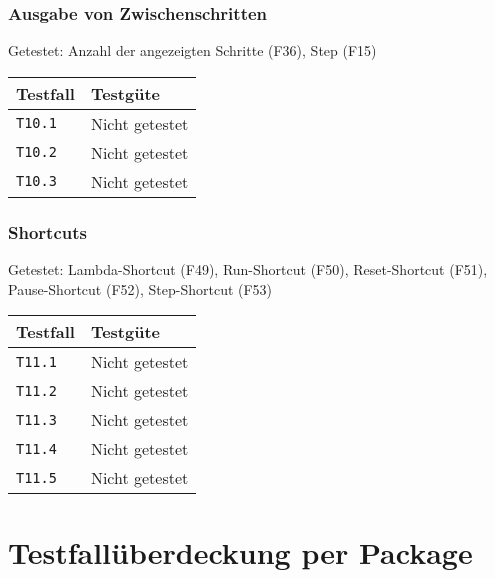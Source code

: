 \documentclass[parskip=full,11pt,twoside]{scrartcl}
\newcommand{\testline}[2]{
    \texttt{#1} & 
    \ifthenelse{\equal{#2}{Nicht getestet}}
        {\cellcolor{red!20}}
        {}
    \ifthenelse{\equal{#2}{Manuell getestet}}
        {\cellcolor{orange!20}}
        {}
    \ifthenelse{\equal{#2}{Automatisiert getestet}}
        {\cellcolor{green!20}}
        {}
    #2 \\ \hline
}
\begin{document}
\subsubsection{Ausgabe von Zwischenschritten}
    Getestet:
    Anzahl der angezeigten Schritte (F36),
    Step (F15)

    \label{shortcuts}
    \begin{center}
        \begin{tabular}{ p{9cm} p{4cm}}
            Testfall & Testgüte \\ \hline
            \testline{T10.1}{Nicht getestet}
            \testline{T10.2}{Nicht getestet}
            \testline{T10.3}{Nicht getestet}
        \end{tabular}
    \end{center}

\subsubsection{Shortcuts}
    Getestet:
    Lambda-Shortcut (F49),
    Run-Shortcut (F50),
    Reset-Shortcut (F51),
    Pause-Shortcut (F52),
    Step-Shortcut (F53)

    \label{shortcuts}
    \begin{center}
        \begin{tabular}{ p{9cm} p{4cm}}
            Testfall & Testgüte \\ \hline
            \testline{T11.1}{Nicht getestet}
            \testline{T11.2}{Nicht getestet}
            \testline{T11.3}{Nicht getestet}
            \testline{T11.4}{Nicht getestet}
            \testline{T11.5}{Nicht getestet}
        \end{tabular}
    \end{center}

\section{Testfallüberdeckung per Package}
\end{document}
